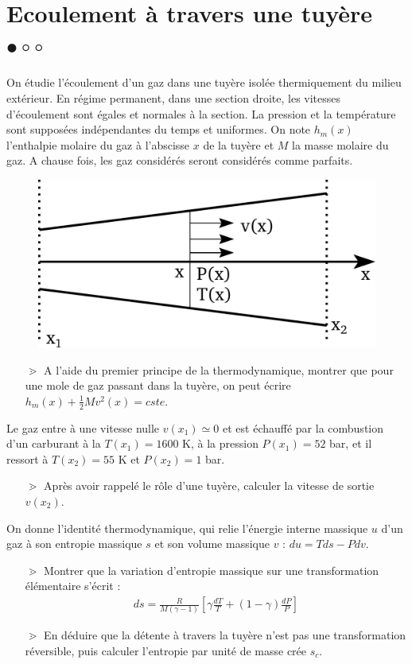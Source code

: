 \documentclass{report}
\begin{document}
\newpage

\section*{Ecoulement à travers une tuyère $\bullet\circ\circ$}

On étudie l'écoulement d'un gaz dans une tuyère isolée thermiquement du milieu extérieur. En régime permanent, dans une section droite, les vitesses d'écoulement sont égales et normales à la section. La pression et la température sont supposées indépendantes du temps et uniformes. On note $h_{m}(x)$ l'enthalpie molaire du gaz à l'abscisse $x$ de la tuyère et $M$ la masse molaire du gaz. A chause fois, les gaz considérés seront considérés comme parfaits.

\begin{figure}[!h]
\centering
\includegraphics[width=0.4\linewidth]{turbine.pdf}
\end{figure}

\begin{itemize}

\item[$\gtrdot$] A l'aide du premier principe de la thermodynamique, montrer que pour une mole de gaz passant dans la tuyère, on peut écrire $h_{m}(x)+\frac{1}{2}Mv^{2}(x)= cste$.

\end{itemize}

Le gaz entre à une vitesse nulle $v(x_1)\simeq0$ et est échauffé par la combustion d'un carburant à la $T(x_1)=1600$ K, à la pression $P(x_1)=52$ bar, et il ressort à $T(x_2)=55$ K et $P(x_2)=1$ bar.

\begin{itemize}
\item[$\gtrdot$] Après avoir rappelé le rôle d'une tuyère, calculer la vitesse de sortie  $v(x_{2})$.
\end{itemize}

On donne l'identité thermodynamique, qui relie l'énergie interne massique $u$ d'un gaz à son entropie massique $s$ et son volume massique $v$ : $du=Tds - Pdv$.

\begin{itemize}
\item[$\gtrdot$] Montrer que la variation d'entropie massique sur une transformation élémentaire s'écrit :
\begin{align*}
	ds=\frac{R}{M(\gamma-1)}\left[\gamma\frac{dT}{T}+(1-\gamma)\frac{dP}{P} \right] 
\end{align*}
\item[$\gtrdot$] En déduire que la détente à travers la tuyère n'est pas une transformation réversible, puis calculer l'entropie par unité de masse crée $s_c$.
\end{itemize}
\end{document}
